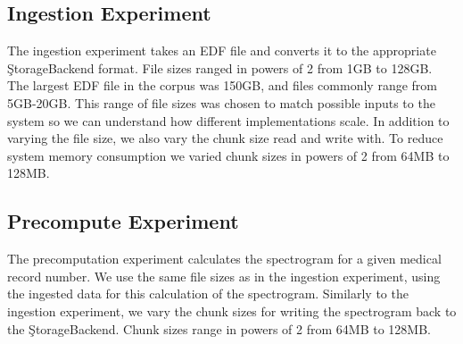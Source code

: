 \subsection{Ingestion Experiment}\label{storage-ch:ingestion-exp}

The ingestion experiment takes an EDF file and converts it to the appropriate
\c{StorageBackend} format. File sizes ranged in powers of 2 from 1GB to 128GB.
The largest EDF file in the corpus was 150GB, and files commonly range from
5GB-20GB. This range of file sizes was chosen to match possible inputs to the
system so we can understand how different implementations scale. In addition to
varying the file size, we also vary the chunk size read and write with.  To
reduce system memory consumption we varied chunk sizes in powers of 2 from 64MB
to 128MB.

\subsection{Precompute Experiment}\label{storage-ch:precompute-exp}

The precomputation experiment calculates the spectrogram for a given medical
record number. We use the same file sizes as in the ingestion experiment, using
the ingested data for this calculation of the spectrogram. Similarly to the
ingestion experiment, we vary the chunk sizes for writing the spectrogram back
to the \c{StorageBackend}. Chunk sizes range in powers of 2 from 64MB to 128MB.

